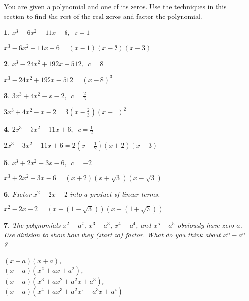 \documentclass{amsbook}
\newtheorem{exc}{}
\newenvironment{ex}{\begin{exc}\normalfont}{\end{exc}}
\numberwithin{section}{chapter}
\numberwithin{equation}{chapter}
\begin{document}
You are given a polynomial and one of its zeros.  Use the techniques in this section to find the rest of the real zeros and factor the polynomial.  


\begin{multicols}{2}

\begin{ex}
	 $x^{3} - 6x^{2} + 11x - 6, \;\; c = 1$ 
	\begin{sol}
		 $x^{3} - 6x^{2} + 11x - 6 = (x - 1)(x - 2)(x - 3)$
	\end{sol}
\end{ex}

\begin{ex}
	$x^{3} - 24x^{2} + 192x - 512, \;\; c = 8$
	\begin{sol}
		$x^{3} - 24x^{2} + 192x - 512 = (x - 8)^{3}$
	\end{sol}
\end{ex}


\begin{ex}
	$3x^{3} + 4x^{2} - x - 2, \;\; c = \frac{2}{3}$
	\begin{sol}
		$3x^{3} + 4x^{2} - x - 2 = 3\left(x - \frac{2}{3}\right)(x + 1)^{2}$
	\end{sol}
\end{ex}

\begin{ex}
	$2x^3-3x^2-11x+6, \;\; c=\frac{1}{2}$
	\begin{sol}
		 $2x^3-3x^2-11x+6 = 2\left(x-\frac{1}{2}\right)(x+2)(x-3)$
	\end{sol}
\end{ex}


\begin{ex}
	$x^3+2x^2-3x-6, \;\; c = -2$
	\begin{sol}
		$x^3+2x^2-3x-6 = (x+2)(x+\sqrt{3})(x-\sqrt{3})$
	\end{sol}
\end{ex}
\end{multicols}


\begin{ex} \label{irrationalFactor}
	Factor $x^2-2x-2$ into a product of linear terms.
	\begin{sol}
		 $x^{2} - 2x - 2 = (x - (1 - \sqrt{3}))(x - (1 + \sqrt{3}))$
	\end{sol}
\end{ex}

\begin{ex}
	The polynomials $x^2-a^2$, $x^3-a^3$,  $x^4-a^4$, and  $x^5-a^5$   obviously have zero $a$. Use division to show how they (start to) factor. What do you think about $x^n-a^n$?
	\begin{sol}
		$(x-a)(x+a)$,\\
		$(x-a)(x^2+ax+a^2)$,\\ $(x-a)(x^3+ax^2 + a^2x +a^3)$,\\ $(x-a)(x^4+ax^3 + a^2x^2 +a^3x + a^4)$
	\end{sol}
\end{ex}
\end{document}
